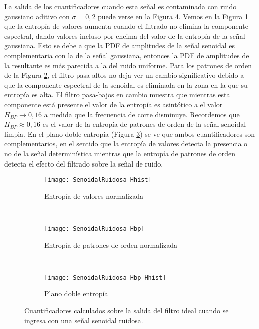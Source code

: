 La salida de los cuantificadores cuando esta señal es contaminada con ruido gaussiano aditivo con $\sigma=0,2$ puede verse en la Figura \ref{fig:SenoidalRuidosa}.
Vemos en la Figura \ref{subfig:SenoidalRuidosa_Hhist} que la entropía de valores aumenta cuando el filtrado no elimina la componente espectral, dando valores incluso por encima del valor de la entropía de la señal gaussiana.
Esto se debe a que la PDF de amplitudes de la señal senoidal es complementaria con la de la señal gaussiana, entonces la PDF de amplitudes de la resultante es más parecida a la del ruido uniforme.
Para los patrones de orden de la Figura \ref{subfig:SenoidalRuidosa_Hbp}, el filtro pasa-altos no deja ver un cambio significativo debido a que la componente espectral de la senoidal es eliminada en la zona en la que su entropía es alta.
El filtro pasa-bajos en cambio muestra que mientras esta componente está presente el valor de la entropía es asintótico a el valor $H_{BP}\to0,16$ a medida que la frecuencia de corte disminuye.
Recordemos que $H_{BP}\approx0,16$ es el valor de la entropía de patrones de orden de la señal senoidal limpia.
En el plano doble entropía (Figura \ref{subfig:SenoidalRuidosa_HbpHhist}) se ve que ambos cuantificadores son complementarios, en el sentido que la entropía de valores detecta la presencia o no de la señal determinística mientras que la entropía de patrones de orden detecta el efecto del filtrado sobre la señal de ruido.
%
\begin{figure}[h]
    \centering
    \begin{subfigure}[t]{.49\textwidth}
        \texttt{[image: SenoidalRuidosa\_Hhist]}
        \caption{Entropía de valores normalizada}
        \label{subfig:SenoidalRuidosa_Hhist}
    \end{subfigure}
    ~ %
    \begin{subfigure}[t]{.49\textwidth}
        \texttt{[image: SenoidalRuidosa\_Hbp]}
        \caption{Entropía de patrones de orden normalizada}
        \label{subfig:SenoidalRuidosa_Hbp}
    \end{subfigure}
    ~ %
    \begin{subfigure}[t]{.49\textwidth}
        \texttt{[image: SenoidalRuidosa\_Hbp\_Hhist]}
        \caption{Plano doble entropía}
        \label{subfig:SenoidalRuidosa_HbpHhist}
    \end{subfigure}
    \caption{Cuantificadores calculados sobre la salida del filtro ideal cuando se ingresa con una señal senoidal ruidosa.}\label{fig:SenoidalRuidosa}
\end{figure}

